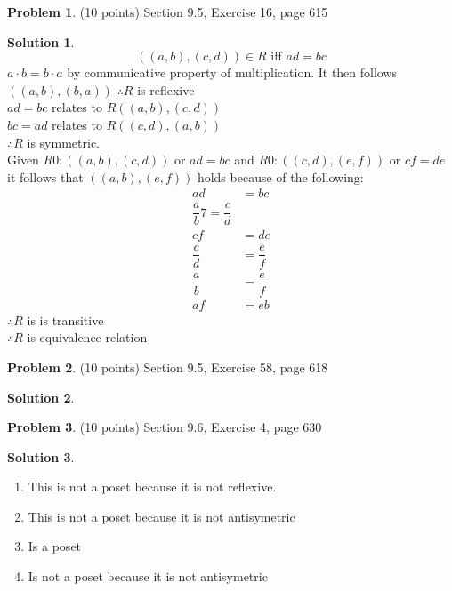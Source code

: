 \documentclass{article}
\theoremstyle{definition}
\newtheorem{problem}{Problem}
\newtheorem*{solution}{Solution}
\begin{document}
\begin{problem} (10 points)
Section 9.5, Exercise 16, page 615
\end{problem}
\begin{solution} 
  $$ ((a, b), (c, d) ) \in R \text{ iff } ad = bc$$
  $a \cdot b = b \cdot a$ by communicative property of multiplication. It then follows $( (a,b), (b,a))$ $\therefore R$ is reflexive  \\
  $ad = bc$ relates to $R((a,b),(c,d))$ \\
  $bc = ad$ relates to $R((c,d),(a,b))$ \\
  $\therefore R$ is symmetric. \\
  Given $R0: ((a,b),(c,d))$ or $ad = bc$ and $R0: ((c,d),(e,f))$ or $cf=de$ it follows that $((a,b),(e,f))$ holds because of the following:
  \begin{align*}
    ad &= bc \\
    \dfrac{a}{b} 7= \dfrac{c}{d} \\
    cf &= de \\
    \dfrac{c}{d} &= \dfrac{e}{f} \\
    \dfrac{a}{b} &= \dfrac{e}{f} \\
    af &= eb
  \end{align*}
  $\therefore R$ is is transitive \\
  $\therefore R$ is equivalence relation  
\end{solution}

\begin{problem} (10 points)
Section 9.5, Exercise 58, page 618
\end{problem}
\begin{solution} 
\end{solution}

\begin{problem} (10 points)
Section 9.6, Exercise 4, page 630
\end{problem}
\begin{solution} \ \\
\begin{enumerate}[label=(\alph*)]
  \item This is not a poset because it is not reflexive. 
  \item This is not a poset because it is not antisymetric
  \item Is a poset
  \item Is not a poset because it is not antisymetric 
\end{enumerate}
\end{solution}
\end{document}
